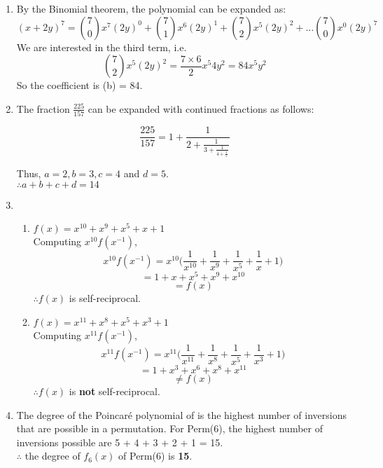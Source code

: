 \documentclass[a4paper,12pt]{article} %
\begin{document}
\begin{enumerate}
\item By the Binomial theorem, the polynomial can be expanded as:
	$$ (x + 2y)^7 = \binom{7}{0}x^{7}(2y)^{0} + \binom{7}{1}x^{6}(2y)^{1} +
		\binom{7}{2}x^{5}(2y)^{2} + \dots \binom{7}{0}x^{0}(2y)^{7}
	$$
	We are interested in the third term, i.e.
	$$
		\binom{7}{2}x^{5}(2y)^{2} = \frac{7 \times 6}{2}x^{5}4y^{2}
		= 84x^{5}y^{2}
	$$
		So the coefficient is (b) = 84.

\item The fraction $\frac{225}{157}$ can be expanded with continued fractions as follows:

	$$
	\frac{225}{157} = 1 + \frac{1}{2 + \frac{1}{3 + \frac{1}{4 + \frac{1}{5}}}}
	$$

	Thus, $a = 2, b = 3, c = 4$ and $d = 5$.\\
	$\therefore a + b + c + d = 14$
\item
	\begin{enumerate}
		\item $f(x) = x^{10} + x^9 + x^5 + x + 1$\\
		Computing $x^{10} f(x^{-1})$,
		$$
		x^{10} f(x^{-1}) = x^{10}\Big(\frac{1}{x^{10}} + \frac{1}{x^9} + \frac{1}{x^5} + \frac{1}{x} + 1\Big)
		$$
		$$ = 1 + x + x^5 + x^9 + x^{10}$$
		$$ = f(x) $$
		$\therefore f(x)$ is self-reciprocal.
		\item $f(x) = x^{11} + x^8 + x^5 + x^3 + 1$\\
		Computing $x^{11} f(x^{-1})$,
		$$
		x^{11} f(x^{-1}) = x^{11}\Big(\frac{1}{x^{11}} + \frac{1}{x^8} + \frac{1}{x^5} + \frac{1}{x^3} + 1\Big)
		$$
		$$ = 1 + x^3 + x^6 + x^8 + x^{11}$$
		$$ \neq f(x) $$
		$\therefore f(x)$ is \textbf{not} self-reciprocal.
	\end{enumerate}
\item The degree of the Poincaré polynomial of is the highest number of inversions that are possible in a permutation. For Perm(6), the highest number of inversions possible are 5 + 4 + 3 + 2 + 1 = 15.\\
	$\therefore$ the degree of $f_{6}(x)$ of Perm(6) is \textbf{15}.


\end{enumerate}
\end{document}

